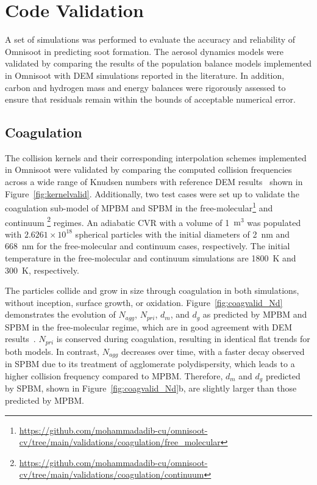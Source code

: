 \section{Code Validation}
A set of simulations was performed to evaluate the accuracy and reliability of Omnisoot in predicting soot formation. The aerosol dynamics models were validated by comparing the results of the population balance models implemented in Omnisoot with DEM simulations reported in the literature. In addition, carbon and hydrogen mass and energy balances were rigorously assessed to ensure that residuals remain within the bounds of acceptable numerical error.

\subsection{Coagulation}
The collision kernels and their corresponding interpolation schemes implemented in Omnisoot were validated by comparing the computed collision frequencies across a wide range of Knudsen numbers with reference DEM results~\citep{goudeli2015coagulation} shown in Figure~\ref{fig:kernelvalid}.
Additionally, two test cases were set up to validate the coagulation sub-model of MPBM and SPBM in the free-molecular\footnote{\href{https://github.com/mohammadadib-cu/omnisoot-cv/tree/main/validations/coagulation/free_molecular}{https://github.com/mohammadadib-cu/omnisoot-cv/tree/main/validations/coagulation/free\_molecular}} and continuum \footnote{\href{https://github.com/mohammadadib-cu/omnisoot-cv/tree/main/validations/coagulation/continuum}{https://github.com/mohammadadib-cu/omnisoot-cv/tree/main/validations/coagulation/continuum}} regimes. An adiabatic CVR with a volume of 1~$\mathrm{m}^3$ was populated with $2.6261 \times 10^{18}$ spherical particles with the initial diameters of 2~nm and 668~nm for the free-molecular and continuum cases, respectively. The initial temperature in the free-molecular and continuum simulations are 1800~K and 300~K, respectively.
 
The particles collide and grow in size through coagulation in both simulations, without inception, surface growth, or oxidation. Figure~\ref{fig:coagvalid_Nd} demonstrates the evolution of ${N_{agg}}$, ${N_{pri}}$, ${d_m}$, and ${d_g}$ as predicted by MPBM and SPBM in the free-molecular regime, which are in good agreement with DEM results~\citep{kholghy2021surface}. ${N_{pri}}$ is conserved during coagulation, resulting in identical flat trends for both models. In contrast, ${N_{agg}}$ decreases over time, with a faster decay observed in SPBM due to its treatment of agglomerate polydispersity, which leads to a higher collision frequency compared to MPBM. Therefore, $d_m$ and $d_g$  predicted by SPBM, shown in Figure~\ref{fig:coagvalid_Nd}b, are slightly larger than those predicted by MPBM.


